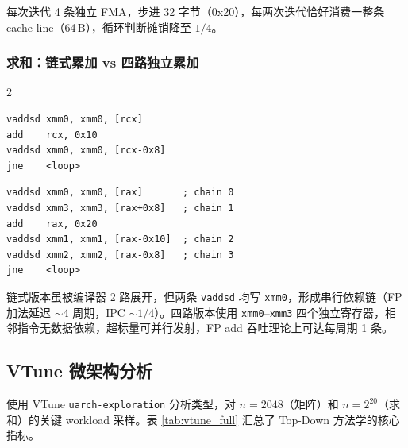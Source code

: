 \documentclass[a4paper,11pt,UTF8]{ctexart}
\begin{document}
每次迭代 4 条独立 FMA，步进 32 字节（0x20），每两次迭代恰好消费一整条 cache line（64\,B），循环判断摊销降至 $1/4$。

\subsubsection{求和：链式累加 vs 四路独立累加}

\begin{multicols}{2}
\begin{lstlisting}[language={[x86masm]Assembler},caption=链式累加（单依赖链）,basicstyle=\ttfamily\tiny,numbers=none]
vaddsd xmm0, xmm0, [rcx]
add    rcx, 0x10
vaddsd xmm0, xmm0, [rcx-0x8]
jne    <loop>
\end{lstlisting}
\columnbreak
\begin{lstlisting}[language={[x86masm]Assembler},caption=四路独立累加,basicstyle=\ttfamily\tiny,numbers=none]
vaddsd xmm0, xmm0, [rax]       ; chain 0
vaddsd xmm3, xmm3, [rax+0x8]   ; chain 1
add    rax, 0x20
vaddsd xmm1, xmm1, [rax-0x10]  ; chain 2
vaddsd xmm2, xmm2, [rax-0x8]   ; chain 3
jne    <loop>
\end{lstlisting}
\end{multicols}

链式版本虽被编译器 2 路展开，但两条 \texttt{vaddsd} 均写 \texttt{xmm0}，形成串行依赖链（FP 加法延迟 $\sim$4 周期，IPC $\sim 1/4$）。四路版本使用 \texttt{xmm0}--\texttt{xmm3} 四个独立寄存器，相邻指令无数据依赖，超标量可并行发射，FP add 吞吐理论上可达每周期 1 条。

\subsection{VTune 微架构分析}
使用 VTune \texttt{uarch-exploration} 分析类型，对 $n=2048$（矩阵）和 $n=2^{20}$（求和）的关键 workload 采样。表 \ref{tab:vtune_full} 汇总了 Top-Down 方法学的核心指标。
\end{document}
